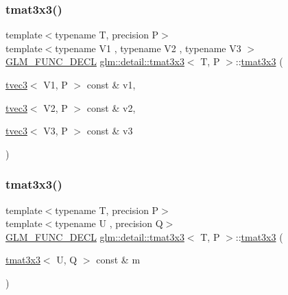 \mbox{\label{structglm_1_1detail_1_1tmat3x3_aa698f62dc4eafac9096370495dc6f74c}} 
\subsubsection{\texorpdfstring{tmat3x3()}{tmat3x3()}\hspace{0.1cm}{\footnotesize\ttfamily [9/22]}}
{\footnotesize\ttfamily template$<$typename T, precision P$>$ \\
template$<$typename V1 , typename V2 , typename V3 $>$ \\
\hyperlink{setup_8hpp_ab2d052de21a70539923e9bcbf6e83a51}{G\+L\+M\+\_\+\+F\+U\+N\+C\+\_\+\+D\+E\+CL} \hyperlink{structglm_1_1detail_1_1tmat3x3}{glm\+::detail\+::tmat3x3}$<$ T, P $>$\+::\hyperlink{structglm_1_1detail_1_1tmat3x3}{tmat3x3} (\begin{DoxyParamCaption}\item[{\hyperlink{structglm_1_1detail_1_1tvec3}{tvec3}$<$ V1, P $>$ const \&}]{v1,  }\item[{\hyperlink{structglm_1_1detail_1_1tvec3}{tvec3}$<$ V2, P $>$ const \&}]{v2,  }\item[{\hyperlink{structglm_1_1detail_1_1tvec3}{tvec3}$<$ V3, P $>$ const \&}]{v3 }\end{DoxyParamCaption})}

\mbox{\label{structglm_1_1detail_1_1tmat3x3_a167e0a30ab00a30c1f3e7c528a8f4aee}} 
\subsubsection{\texorpdfstring{tmat3x3()}{tmat3x3()}\hspace{0.1cm}{\footnotesize\ttfamily [10/22]}}
{\footnotesize\ttfamily template$<$typename T, precision P$>$ \\
template$<$typename U , precision Q$>$ \\
\hyperlink{setup_8hpp_ab2d052de21a70539923e9bcbf6e83a51}{G\+L\+M\+\_\+\+F\+U\+N\+C\+\_\+\+D\+E\+CL} \hyperlink{structglm_1_1detail_1_1tmat3x3}{glm\+::detail\+::tmat3x3}$<$ T, P $>$\+::\hyperlink{structglm_1_1detail_1_1tmat3x3}{tmat3x3} (\begin{DoxyParamCaption}\item[{\hyperlink{structglm_1_1detail_1_1tmat3x3}{tmat3x3}$<$ U, Q $>$ const \&}]{m }\end{DoxyParamCaption})\hspace{0.3cm}{\ttfamily [explicit]}}


